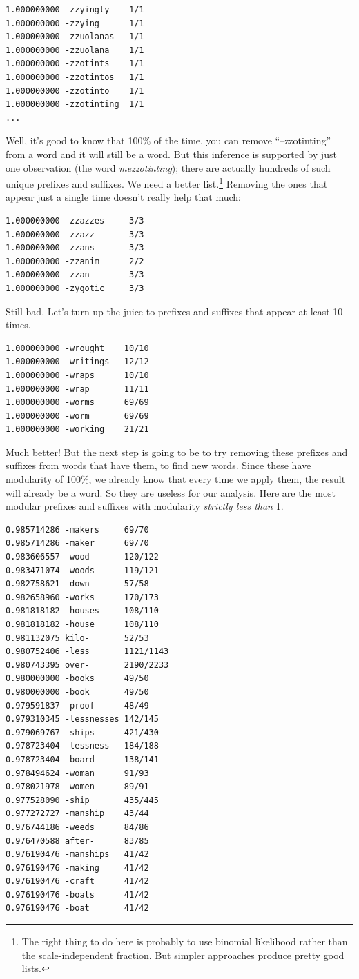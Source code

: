 \documentclass[twocolumn]{article}
\begin{document}
\begin{verbatim}
1.000000000 -zzyingly    1/1
1.000000000 -zzying      1/1
1.000000000 -zzuolanas   1/1
1.000000000 -zzuolana    1/1
1.000000000 -zzotints    1/1
1.000000000 -zzotintos   1/1
1.000000000 -zzotinto    1/1
1.000000000 -zzotinting  1/1
...
\end{verbatim}

Well, it's good to know that 100\% of the time, you can remove
``--zzotinting'' from a word and it will still be a word. But this
inference is supported by just one observation (the word {\it
  mezzotinting}); there are actually hundreds of such unique prefixes
and suffixes. We need a better list.\!\footnote{The right thing to do
  here is probably to use binomial likelihood rather than the
  scale-independent fraction. But simpler approaches produce pretty
  good lists.} Removing the ones that appear just a single time
doesn't really help that much:

\begin{verbatim}
1.000000000 -zzazzes     3/3
1.000000000 -zzazz       3/3
1.000000000 -zzans       3/3
1.000000000 -zzanim      2/2
1.000000000 -zzan        3/3
1.000000000 -zygotic     3/3
\end{verbatim}

Still bad. Let's turn up the juice to prefixes and suffixes that
appear at least 10 times.

\begin{verbatim}
1.000000000 -wrought    10/10
1.000000000 -writings   12/12
1.000000000 -wraps      10/10
1.000000000 -wrap       11/11
1.000000000 -worms      69/69
1.000000000 -worm       69/69
1.000000000 -working    21/21
\end{verbatim}

Much better! But the next step is going to be to try removing these
prefixes and suffixes from words that have them, to find new words.
Since these have modularity of 100\%, we already know that every
time we apply them, the result will already be a word. So they are
useless for our analysis. Here are the most modular prefixes
and suffixes with modularity {\it strictly less than} 1.

\begin{verbatim}
0.985714286 -makers     69/70
0.985714286 -maker      69/70
0.983606557 -wood       120/122
0.983471074 -woods      119/121
0.982758621 -down       57/58
0.982658960 -works      170/173
0.981818182 -houses     108/110
0.981818182 -house      108/110
0.981132075 kilo-       52/53
0.980752406 -less       1121/1143
0.980743395 over-       2190/2233
0.980000000 -books      49/50
0.980000000 -book       49/50
0.979591837 -proof      48/49
0.979310345 -lessnesses 142/145
0.979069767 -ships      421/430
0.978723404 -lessness   184/188
0.978723404 -board      138/141
0.978494624 -woman      91/93
0.978021978 -women      89/91
0.977528090 -ship       435/445
0.977272727 -manship    43/44
0.976744186 -weeds      84/86
0.976470588 after-      83/85
0.976190476 -manships   41/42
0.976190476 -making     41/42
0.976190476 -craft      41/42
0.976190476 -boats      41/42
0.976190476 -boat       41/42
\end{verbatim}
\end{document}
